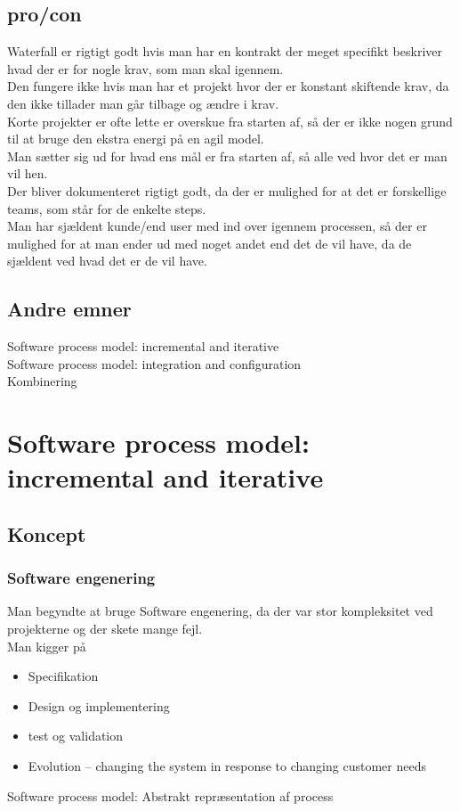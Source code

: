 \documentclass[11pt,a4paper]{article}
\begin{document}
\subsection{pro/con}
Waterfall er rigtigt godt hvis man har en kontrakt der meget specifikt beskriver hvad der er for nogle krav, som man skal igennem.\\
Den fungere ikke hvis man har et projekt hvor der er konstant skiftende krav, da den ikke tillader man går tilbage og ændre i krav.\\
Korte projekter er ofte lette er overskue fra starten af, så der er ikke nogen grund til at bruge den ekstra energi på en agil model.\\
Man sætter sig ud for hvad ens mål er fra starten af, så alle ved hvor det er man vil hen.\\
Der bliver dokumenteret rigtigt godt, da der er mulighed for at det er forskellige teams, som står for de enkelte steps.\\
Man har sjældent kunde/end user med ind over igennem processen, så der er mulighed for at man ender ud med noget andet end det de vil have, da de sjældent ved hvad det er de vil have.
\subsection{Andre emner}
Software process model: incremental and iterative\\
Software process model: integration and configuration\\
Kombinering
\newpage
\section{Software process model: incremental and iterative}
\subsection{Koncept}
\subsubsection*{Software engenering}
Man begyndte at bruge Software engenering, da der var stor kompleksitet ved projekterne og der skete mange fejl.\\
Man kigger på 
\begin{itemize}
\item Specifikation
\item Design og implementering
\item test og validation
\item Evolution – changing the system in response to changing customer needs
\end{itemize}
Software process model: Abstrakt repræsentation af process
\end{document}

